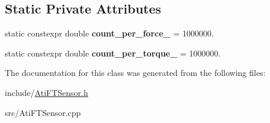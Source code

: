 \subsection*{Static Private Attributes}
\begin{DoxyCompactItemize}
\item 
\mbox{\label{classati__ft__sensor_1_1AtiFTSensor_ad6a9362c8a68676e9c70857f1d0731ec}} 
static constexpr double {\bfseries count\+\_\+per\+\_\+force\+\_\+} = 1000000.
\item 
\mbox{\label{classati__ft__sensor_1_1AtiFTSensor_afe77e60a64a50e9e39c1099bfc33d908}} 
static constexpr double {\bfseries count\+\_\+per\+\_\+torque\+\_\+} = 1000000.
\end{DoxyCompactItemize}


The documentation for this class was generated from the following files\+:\begin{DoxyCompactItemize}
\item 
include/\hyperlink{AtiFTSensor_8h}{Ati\+F\+T\+Sensor.\+h}\item 
src/Ati\+F\+T\+Sensor.\+cpp\end{DoxyCompactItemize}
